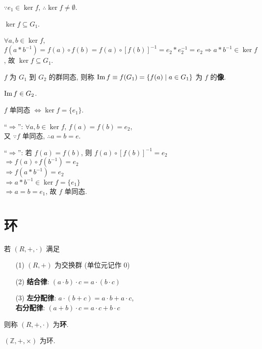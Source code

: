 \documentclass{note}
\begin{document}
$\because e_1\in\ker f$, $\therefore\ker f\neq\emptyset$.

$\ker f\subseteq G_1$.
\begin{pf}
    $\forall a,b\in\ker f$, $f(a*b^{-1})=f(a)\circ f(b)=f(a)\circ[f(b)]^{-1}=e_2*e_2^{-1}=e_2\Longrightarrow a*b^{-1}\in\ker f$, 故 $\ker f\subseteq G_1$.
\end{pf}

\begin{df}[群同态的像]
    $f$ 为 $G_1$ 到 $G_2$ 的群同态, 则称 $\operatorname{Im} f\equiv f(G_1)=\{f(a)\mid a\in G_1\}$ 为 $f$ 的\textbf{像}.
\end{df}

$\operatorname{Im} f\in G_2$.

\begin{thm}
    $f$ 单同态 $\Longleftrightarrow\ker f=\{e_1\}$.
\end{thm}
\begin{pf}
    ``$\Longrightarrow$'': $\forall a,b\in\ker f$, $f(a)=f(b)=e_2$,\\
    又 $\because f$ 单同态, $\therefore a=b=e$.

    ``$\Longrightarrow$'': 若 $f(a)=f(b)$, 则 $f(a)\circ[f(b)]^{-1}=e_2$\\
    $\Longrightarrow f(a)\circ f(b^{-1})=e_2$\\
    $\Longrightarrow f(a*b^{-1})=e_2$\\
    $\Longrightarrow a*b^{-1}\in\ker f=\{e_1\}$\\
    $\Longrightarrow a=b=e_1$, 故 $f$ 单同态.
\end{pf}

\section{环}
\begin{df}[环]
    若 $(R,+,\cdot)$ 满足
    \begin{itemize}
        \item[(1)] $(R,+)$ 为交换群 (单位元记作 $0$)
        \item[(2)] \textbf{结合律}: $(a\cdot b)\cdot c=a\cdot(b\cdot c)$
        \item[(3)] \textbf{左分配律}: $a\cdot(b+c)=a\cdot b+a\cdot c$,\\
        \textbf{右分配律}: $(a+b)\cdot c=a\cdot c+b\cdot c$
    \end{itemize}
    则称 $(R,+,\cdot)$ 为\textbf{环}.
\end{df}

\begin{eg}
    $(\mathbb{Z},+,\times)$ 为环.
\end{eg}
\end{document}
